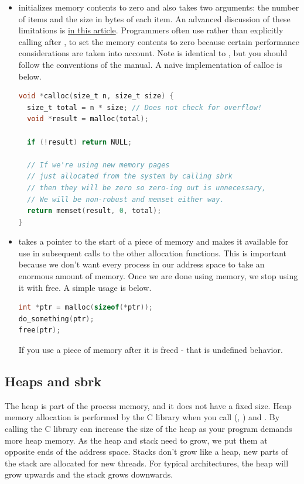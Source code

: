 \begin{itemize}
\begin{lstlisting}[language=C]
}
\end{lstlisting}

\item {} initializes memory contents to zero and also takes two arguments: the number of items and the size in bytes of each item.
An advanced discussion of these limitations is \href{http://locklessinc.com/articles/calloc/}{in this article}.
Programmers often use  rather than explicitly calling  after , to set the memory contents to zero because certain performance considerations are taken into account.
Note  is identical to , but you should follow the conventions of the manual.
A naive implementation of calloc is below.

\begin{lstlisting}[language=C]
void *calloc(size_t n, size_t size) {
  size_t total = n * size; // Does not check for overflow!
  void *result = malloc(total);

  if (!result) return NULL;

  // If we're using new memory pages
  // just allocated from the system by calling sbrk
  // then they will be zero so zero-ing out is unnecessary,
  // We will be non-robust and memset either way.
  return memset(result, 0, total);
}
\end{lstlisting}

\item {} takes a pointer to the start of a piece of memory and makes it available for use in subsequent calls to the other allocation functions.
This is important because we don't want every process in our address space to take an enormous amount of memory.
Once we are done using memory, we stop using it with free.
A simple usage is below.

\begin{lstlisting}[language=C]
int *ptr = malloc(sizeof(*ptr));
do_something(ptr);
free(ptr);
\end{lstlisting}

If you use a piece of memory after it is freed - that is undefined behavior.

\end{itemize}

\subsection{Heaps and sbrk}

The heap is part of the process memory, and it does not have a fixed size.
Heap memory allocation is performed by the C library when you call  (, ) and .
By calling  the C library can increase the size of the heap as your program demands more heap memory.
As the heap and stack need to grow, we put them at opposite ends of the address space.
Stacks don't grow like a heap, new parts of the stack are allocated for new threads.
For typical architectures, the heap will grow upwards and the stack grows downwards.


